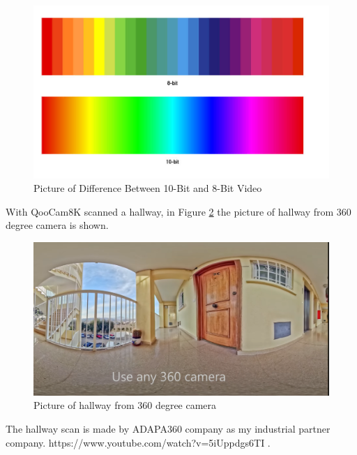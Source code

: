 \begin{itemize}
\begin{figure}[H]
  \centering
  \includegraphics[width= 1.2\textwidth]{Figures/Bit.PNG}
  \caption[Picture of Difference Between 10-Bit and 8-Bit Video]{Picture of Difference Between 10-Bit and 8-Bit Video \cite{10Bit}}
  \label{fig:Picture of Difference Betwwen 10-Bit and 8-Bit Video}
\end{figure}
 
\end{itemize}
With QooCam8K scanned a hallway, in Figure \ref{fig:360 degree camera} the picture of hallway from 360 degree camera is shown.

\begin{figure}[H]
  \centering
  \includegraphics[width= 1.0\textwidth]{Figures/hallscan4.PNG}
  \caption[Picture of Hallway from 360 deegre camera]{Picture of hallway from 360 degree camera}
  \label{fig:360 degree camera}
\end{figure}
\noindent The hallway scan is made by ADAPA360 company as my industrial partner company. https://www.youtube.com/watch?v=5iUppdgs6TI \cite{ADAPA360}.\\

